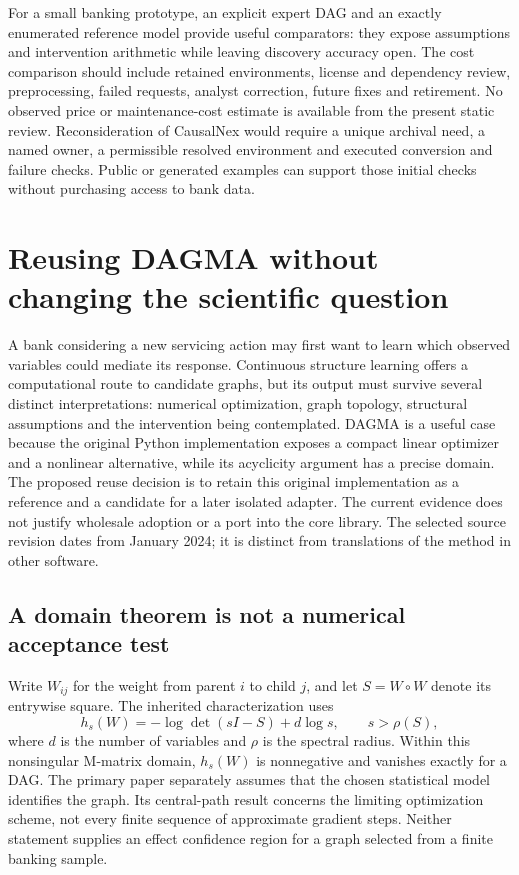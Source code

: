 For a small banking prototype, an explicit expert DAG and an exactly
enumerated reference model provide useful comparators: they expose assumptions
and intervention arithmetic while leaving discovery accuracy open. The cost
comparison should include retained environments, license and dependency
review, preprocessing, failed requests, analyst correction, future fixes and
retirement. No observed price or maintenance-cost estimate is available from
the present static review. Reconsideration of CausalNex would require a unique
archival need, a named owner, a permissible resolved environment and executed
conversion and failure checks. Public or generated examples can support
those initial checks without purchasing access to bank data.
\label{exec14:causalnex-end}


\section{Reusing DAGMA without changing the scientific question}
\label{exec16:dagma-reuse}

A bank considering a new servicing action may first want to learn which
observed variables could mediate its response. Continuous structure learning
offers a computational route to candidate graphs, but its output must survive
several distinct interpretations: numerical optimization, graph topology,
structural assumptions and the intervention being contemplated. DAGMA is a
useful case because the original Python implementation exposes a compact
linear optimizer and a nonlinear alternative, while its acyclicity argument
has a precise domain. The proposed reuse decision is to retain this original
implementation as a reference and a candidate for a later isolated adapter.
The current evidence does not justify wholesale adoption or a port into the
core library. The selected source revision dates from January 2024; it is
distinct from translations of the method in other software.
\citep{exec16_dagma_primary}

\subsection{A domain theorem is not a numerical acceptance test}

Write $W_{ij}$ for the weight from parent $i$ to child $j$, and let
$S=W\circ W$ denote its entrywise square. The inherited characterization
uses
\begin{equation}
 h_s(W)=-\log\det(sI-S)+d\log s,
 \qquad s>\rho(S),
 \label{exec16:dagma-domain}
\end{equation}
where $d$ is the number of variables and $\rho$ is the spectral radius.
Within this nonsingular M-matrix domain, $h_s(W)$ is nonnegative and vanishes
exactly for a DAG. The primary paper separately assumes that the chosen
statistical model identifies the graph. Its central-path result concerns
the limiting optimization scheme, not every finite sequence of approximate
gradient steps. Neither statement supplies an effect confidence region for
a graph selected from a finite banking sample.
\citep[Section 2, Theorem 1 and Lemma 6]{exec13_pydisc_dagma2022}

